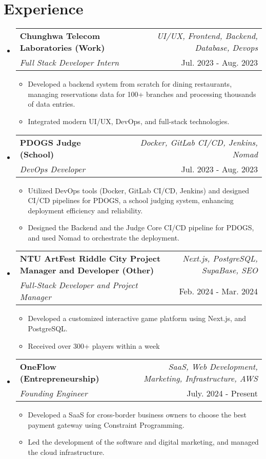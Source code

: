 \documentclass[a4paper,11pt]{article}
\makeatletter
\newcommand{\resumeSubheading}[4]{
\vspace{0.5mm}\item
    \begin{tabular*}{0.98\textwidth}[t]{l@{\extracolsep{\fill}}r}
        \textbf{#1} & \textit{\footnotesize{#4}} \\
        \textit{\footnotesize{#3}} &  \footnotesize{#2}\\
    \end{tabular*}
    \vspace{-2.4mm}
}
\newcommand{\resumeSubHeadingListStart}{\begin{itemize}[leftmargin=*,labelsep=0mm]}
\newcommand{\resumeItemListStart}{\begin{justify}\begin{itemize}[leftmargin=3ex, rightmargin=2ex, noitemsep,labelsep=1.2mm,itemsep=0mm]\small}
\newcommand{\resumeSubHeadingListEnd}{\end{itemize}\vspace{2mm}}
\newcommand{\resumeItemListEnd}{\end{itemize}\end{justify}\vspace{-2mm}}
\makeatother
\begin{document}
\section{\textbf{Experience}}
\resumeSubHeadingListStart

\resumeSubheading
{Chunghwa Telecom Laboratories (Work)}{Jul. 2023 - Aug. 2023}
{Full Stack Developer Intern}{UI/UX, Frontend, Backend, Database, Devops}
\vspace{-2.0mm}
\resumeItemListStart
\item {Developed a backend system from scratch for dining restaurants, managing reservations data for 100+ branches and processing thousands of data entries.}
\item {Integrated modern UI/UX, DevOps, and full-stack technologies.}
\resumeItemListEnd

\vspace{-3.0mm}

\resumeSubheading
{PDOGS Judge (School)}{Jul. 2023 - Aug. 2023}
{DevOps Developer}{Docker, GitLab CI/CD, Jenkins, Nomad}
\vspace{-1.0mm}
\resumeItemListStart
\item {Utilized DevOps tools (Docker, GitLab CI/CD, Jenkins) and designed CI/CD pipelines for PDOGS, a school judging system, enhancing deployment efficiency and reliability.}
\item {Designed the Backend and the Judge Core CI/CD pipeline for PDOGS, and used Nomad to orchestrate the deployment.}
\resumeItemListEnd
\vspace{-3.0mm}

\resumeSubheading
{NTU ArtFest Riddle City Project Manager and Developer (Other)}{Feb. 2024 - Mar. 2024}
{Full-Stack Developer and Project Manager}{Next.js, PostgreSQL, SupaBase, SEO}
\vspace{-1.0mm}
\resumeItemListStart
\item {Developed a customized interactive game platform using Next.js, and PostgreSQL.}
\item {Received over 300+ players within a week}
\resumeItemListEnd
\vspace{-3.0mm}
\resumeSubheading
{OneFlow (Entrepreneurship)}{July. 2024 - Present}
{Founding Engineer}{SaaS, Web Development, Marketing, Infrastructure, AWS}
\vspace{-1.0mm}
\resumeItemListStart
\item {Developed a SaaS for cross-border business owners to choose the best payment gateway using Constraint Programming.}
\item {Led the development of the software and digital marketing, and managed the cloud infrastructure.}
\resumeItemListEnd
\resumeSubHeadingListEnd
\vspace{-9mm}
\end{document}
